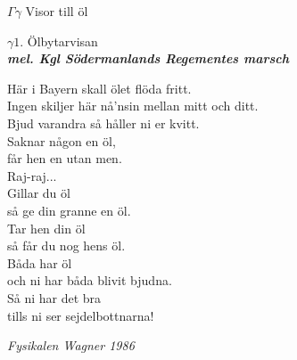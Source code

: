 \documentclass[a6paper,10pt]{article}
\newcommand{\mel}[1]{\small\textbf{\textit{mel. #1 \\}}}
\begin{document}
\noindent
\huge{$\Gamma\gamma$ Visor till öl}
\begin{center}
\Large $\gamma1$. Ölbytarvisan \\ 
\mel{Kgl Södermanlands Regementes marsch}
\end{center}
\small Här i Bayern skall ölet flöda fritt. \\
Ingen skiljer här nå'nsin mellan mitt och ditt. \\
Bjud varandra så håller ni er kvitt. \\
Saknar någon en öl, \\
får hen en utan men. \\
\newline
Raj-raj... \\
\newline
Gillar du öl \\
så ge din granne en öl. \\
Tar hen din öl \\
så får du nog hens öl. \\
Båda har öl \\
och ni har båda blivit bjudna. \\
Så ni har det bra \\
tills ni ser sejdelbottnarna! 
\begin{flushright}
\textit{Fysikalen Wagner 1986}
\end{flushright}
\end{document}
